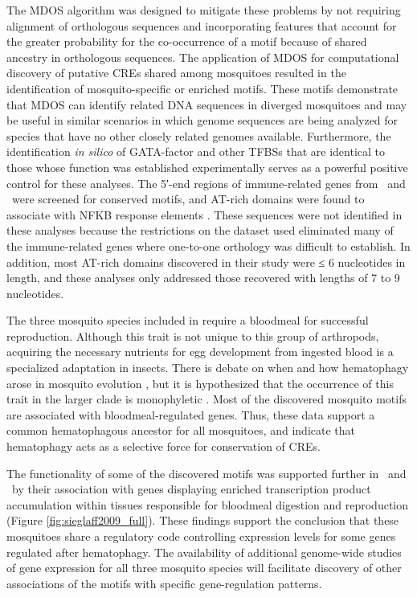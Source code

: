 The \gls{MDOS} algorithm \cite{Wu2008} was designed to mitigate these problems by not requiring alignment of orthologous sequences and incorporating features that account for the greater probability for the co-occurrence of a motif because of shared ancestry in orthologous sequences. The application of \gls{MDOS} for computational discovery of putative \glspl{CRE} shared among mosquitoes resulted in the identification of mosquito-specific or enriched motifs. These motifs demonstrate that \gls{MDOS} can identify related DNA sequences in diverged mosquitoes and may be useful in similar scenarios in which genome sequences are being analyzed for species that have no other closely related genomes available. Furthermore, the identification \textit{in silico} of GATA-factor and other \glspl{TFBS} that are identical to those whose function was established experimentally \cite{Kokoza2001,Cho2006,Attardo2003,Ahmed1999,Pham2005,Giannoni2001,Dittmer2003,Meredith2006} serves as a powerful positive control for these analyses. The 5′-end regions of immune-related genes from \Ag\ and \Dm\ were screened for conserved motifs, and AT-rich domains were found to associate with \gls{NFKB} response elements \cite{Hernandez-Romano2008}. These sequences were not identified in these analyses because the restrictions on the dataset used eliminated many of the immune-related genes where one-to-one orthology was difficult to establish. In addition, most AT-rich domains discovered in their study were ≤ 6 nucleotides in length, and these analyses only addressed those recovered with lengths of 7 to 9 nucleotides.

The three mosquito species included in \citet{Sieglaff2009} require a bloodmeal for successful reproduction. Although this trait is not unique to this group of arthropods, acquiring the necessary nutrients for egg development from ingested blood is a specialized adaptation in insects. There is debate on when and how \gls{hematophagy} arose in mosquito evolution \cite{Rai1999a}, but it is hypothesized that the occurrence of this trait in the larger clade is \gls{monophyletic} \cite{Borkent2004,Calvo2006}. Most of the discovered mosquito motifs are associated with bloodmeal-regulated genes. Thus, these data support a common hematophagous ancestor for all mosquitoes, and indicate that \gls{hematophagy} acts as a selective force for conservation of \glspl{CRE}.

The functionality of some of the discovered motifs was supported further in \Ag\ and \Aa\ by their association with genes displaying enriched transcription product accumulation within tissues responsible for bloodmeal digestion and reproduction (Figure \ref{fig:sieglaff2009_full}). These findings support the conclusion that these mosquitoes share a regulatory code controlling expression levels for some genes regulated after \gls{hematophagy}. The availability of additional genome-wide studies of gene expression for all three mosquito species will facilitate discovery of other associations of the motifs with specific gene-regulation patterns.


